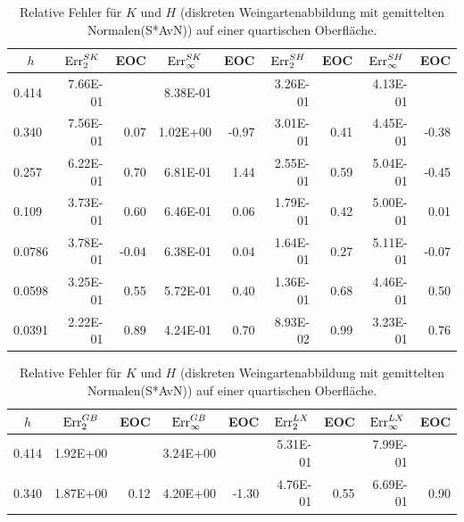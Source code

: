 \begin{table}[htbp]
\begin{tabular}{|l|r|r|r|r|r|r|r|r|}
      \hline
      \multicolumn{1}{|c|}{\rule{0pt}{11pt}\( h \)} & \multicolumn{1}{c|}{\( \text{Err}_{2}^{SK} \)} & \multicolumn{1}{c|}{EOC} & 
           \multicolumn{1}{c|}{\( \text{Err}_{\infty}^{SK} \)} & \multicolumn{1}{c|}{EOC} & \multicolumn{1}{c|}{\( \text{Err}_{2}^{SH} \)} &
           \multicolumn{1}{c|}{EOC} & \multicolumn{1}{c|}{\( \text{Err}_{\infty}^{SH} \)} & \multicolumn{1}{c|}{EOC} \\ \hline
           0.414 & 7.66E-01 & \multicolumn{1}{l|}{} & 8.38E-01 & \multicolumn{1}{l|}{} & 3.26E-01 & \multicolumn{1}{l|}{} & 4.13E-01 & \multicolumn{1}{l|}{} \\ \hline
            0.340 & 7.56E-01 & 0.07 & 1.02E+00 & -0.97 & 3.01E-01 & 0.41 & 4.45E-01 & -0.38 \\ \hline
            0.257 & 6.22E-01 & 0.70 & 6.81E-01 & 1.44 & 2.55E-01 & 0.59 & 5.04E-01 & -0.45 \\ \hline
            0.109 & 3.73E-01 & 0.60 & 6.46E-01 & 0.06 & 1.79E-01 & 0.42 & 5.00E-01 & 0.01 \\ \hline
            0.0786 & 3.78E-01 & -0.04 & 6.38E-01 & 0.04 & 1.64E-01 & 0.27 & 5.11E-01 & -0.07 \\ \hline
            0.0598 & 3.25E-01 & 0.55 & 5.72E-01 & 0.40 & 1.36E-01 & 0.68 & 4.46E-01 & 0.50 \\ \hline
            0.0391 & 2.22E-01 & 0.89 & 4.24E-01 & 0.70 & 8.93E-02 & 0.99 & 3.23E-01 & 0.76 \\ \hline
      \end{tabular}
      \caption[Weingarten auf der Sphäre]{Relative Fehler für \( K \) und \( H \) (diskreten Weingartenabbildung mit gemittelten
      Normalen(S*AvN)) auf einer quartischen Oberfläche.}
      \label{tabHeineBWeingartenAvN}
      \vspace{10pt}
      \begin{tabular}{|l|r|r|r|r|r|r|r|r|}
      \hline
      \multicolumn{1}{|c|}{\rule{0pt}{11pt}\( h \)} & \multicolumn{1}{c|}{\( \text{Err}_{2}^{GB} \)} & \multicolumn{1}{c|}{EOC} & 
           \multicolumn{1}{c|}{\( \text{Err}_{\infty}^{GB} \)} & \multicolumn{1}{c|}{EOC} & \multicolumn{1}{c|}{\( \text{Err}_{2}^{LX} \)} &
           \multicolumn{1}{c|}{EOC} & \multicolumn{1}{c|}{\( \text{Err}_{\infty}^{LX} \)} & \multicolumn{1}{c|}{EOC} \\ \hline
           0.414 & 1.92E+00 & \multicolumn{1}{l|}{} & 3.24E+00 & \multicolumn{1}{l|}{} & 5.31E-01 & \multicolumn{1}{l|}{} & 7.99E-01 & \multicolumn{1}{l|}{} \\ \hline
            0.340 & 1.87E+00 & 0.12 & 4.20E+00 & -1.30 & 4.76E-01 & 0.55 & 6.69E-01 & 0.90 \\ \hline

\end{tabular}
\end{table}
